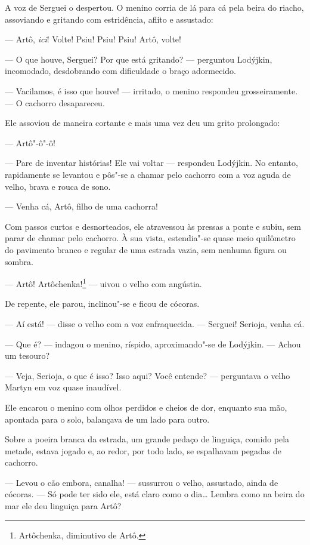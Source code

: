 A voz de Serguei o despertou. O menino corria de lá para cá pela beira
do riacho, assoviando e gritando com estridência, aflito e assustado:

--- Artô, \emph{ici}! Volte! Psiu! Psiu! Psiu! Artô, volte!

--- O que houve, Serguei? Por que está gritando? --- perguntou Lodýjkin,
incomodado, desdobrando com dificuldade o braço adormecido.

--- Vacilamos, é isso que houve! --- irritado, o menino respondeu
grosseiramente. --- O cachorro desapareceu.

Ele assoviou de maneira cortante e mais uma vez deu um grito prolongado:

--- Artô"-ô"-ô!

--- Pare de inventar histórias! Ele vai voltar --- respondeu Lodýjkin.
No entanto, rapidamente se levantou e pôs"-se a chamar pelo cachorro com
a voz aguda de velho, brava e rouca de sono.

--- Venha cá, Artô, filho de uma cachorra!

Com passos curtos e desnorteados, ele atravessou às pressas a ponte e
subiu, sem parar de chamar pelo cachorro. À sua vista, estendia"-se quase
meio quilômetro do pavimento branco e regular de uma estrada vazia, sem
nenhuma figura ou sombra.

--- Artô! Artôchenka!\footnote{Artôchenka, diminutivo de Artô.} ---
uivou o velho com angústia.

De repente, ele parou, inclinou"-se e ficou de cócoras.

--- Aí está! --- disse o velho com a voz enfraquecida. --- Serguei!
Serioja, venha cá.

--- Que é? --- indagou o menino, ríspido, aproximando"-se de Lodýjkin.
--- Achou um tesouro?

--- Veja, Serioja, o que é isso? Isso aqui? Você entende? --- perguntava
o velho Martyn em voz quase inaudível.

Ele encarou o menino com olhos perdidos e cheios de dor, enquanto sua
mão, apontada para o solo, balançava de um lado para outro.

Sobre a poeira branca da estrada, um grande pedaço de linguiça, comido
pela metade, estava jogado e, ao redor, por todo lado, se espalhavam
pegadas de cachorro.

--- Levou o cão embora, canalha! --- sussurrou o velho, assustado, ainda
de cócoras. --- Só pode ter sido ele, está claro como o dia\ldots{} Lembra
como na beira do mar ele deu linguiça para Artô?

